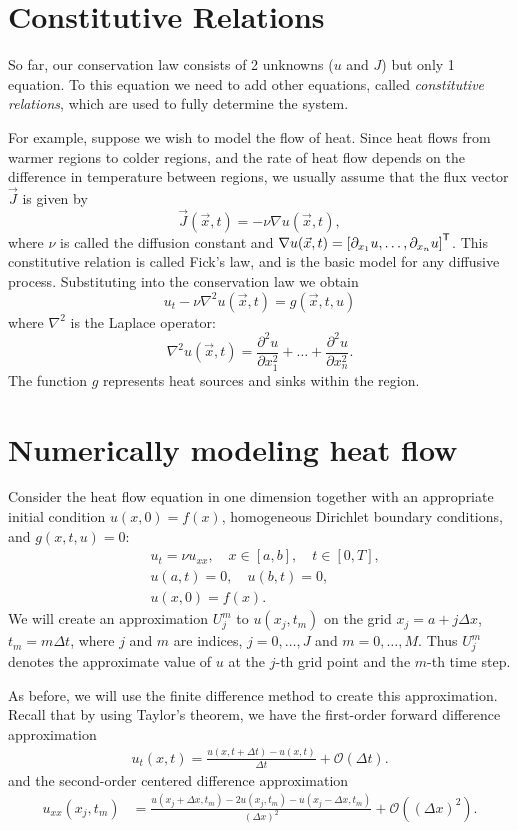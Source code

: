 \section*{Constitutive Relations}
So far, our conservation law consists of 2 unknowns ($u$ and $J$) but only 1 equation.
To this equation we need to add other equations, called \textit{constitutive relations}, which are used to fully determine the system.

For example, suppose we wish to model the flow of heat.
Since heat flows from warmer regions to colder regions, and the rate of heat flow depends on the difference in temperature between regions, we usually assume that the flux vector $\vec{J}$ is given by
\[\vec{J}(\vec x,t) = -\nu \nabla u(\vec x,t),\]
where $\nu$ is called the diffusion constant and $\nabla u(\vec x,t) = \left[ \partial_{x_1}u, \dots, \partial_{x_n}u\right]^{\mathsf T} $.
This constitutive relation is called Fick's law, and is the basic model for any diffusive process.
Substituting into the conservation law we obtain
\[u_t -\nu \nabla^2 u(\vec x,t) = g(\vec{x},t,u)\]
where $\nabla^2$ is the Laplace operator:
\[\nabla^2 u(\vec x,t) = \frac{\partial ^2 u}{\partial x_1^2}+\dots+ \frac{\partial ^2 u}{\partial x_n^2}.\]
The function $g$ represents heat sources and sinks within the region.

\section*{Numerically modeling heat flow}
Consider the heat flow equation in one dimension together with an appropriate initial condition $u(x,0)=f(x)$, homogeneous Dirichlet boundary conditions, and $g(x,t,u)=0$:
\begin{align*}
	&{ } u_t = \nu u_{xx}, \quad x \in [a,b],\quad t \in [0,T], \\
	&{ } u(a,t) = 0,\quad u(b,t) = 0,\\
	&{ } u(x,0) = f(x).
\end{align*}
We will create an approximation $U^m_j$ to $u(x_j,t_m)$ on the grid $x_j = a +  j\Delta x$, $t_m = m\Delta t$, where $j$ and $m$ are indices, $j = 0, \ldots, J$ and $m = 0, \ldots, M$.
Thus $U_j^m$ denotes the approximate value of $u$ at the $j$-th grid point and the $m$-th time step.

As before, we will use the finite difference method to create this approximation.
Recall that by using Taylor's theorem, we have the first-order forward difference approximation
\begin{align*}
	u_t(x,t) = \frac{u(x,t+\Delta t) - u(x,t)}{\Delta t} + \mathcal{O}(\Delta t).
\end{align*}
and the second-order centered difference approximation
\begin{align*}
	u_{xx}(x_j,t_m) &= \frac{u(x_j + \Delta x,t_m )-2 u(x_j,t_m)- u(x_j - \Delta x,t_m)}{(\Delta x)^2} + \mathcal{O}\left( (\Delta x)^2 \right).
\end{align*}

